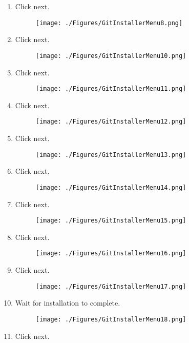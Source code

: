 \documentclass[12pt]{article}
\begin{document}
\begin{center}
\begin{enumerate}
		\item Click next.
		      \begin{figure}[H]
			      \texttt{[image: ./Figures/GitInstallerMenu8.png]}
		      \end{figure}
		\item Click next.
		      \begin{figure}[H]
			      \texttt{[image: ./Figures/GitInstallerMenu10.png]}
		      \end{figure}
		\item Click next.
		      \begin{figure}[H]
			      \texttt{[image: ./Figures/GitInstallerMenu11.png]}
		      \end{figure}
		\item Click next.
		      \begin{figure}[H]
			      \texttt{[image: ./Figures/GitInstallerMenu12.png]}
		      \end{figure}
		\item Click next.
		      \begin{figure}[H]
			      \texttt{[image: ./Figures/GitInstallerMenu13.png]}
		      \end{figure}
		\item Click next.
		      \begin{figure}[H]
			      \texttt{[image: ./Figures/GitInstallerMenu14.png]}
		      \end{figure}
		\item Click next.
		      \begin{figure}[H]
			      \texttt{[image: ./Figures/GitInstallerMenu15.png]}
		      \end{figure}
		\item Click next.
		      \begin{figure}[H]
			      \texttt{[image: ./Figures/GitInstallerMenu16.png]}
		      \end{figure}
		\item Click next.
		      \begin{figure}[H]
			      \texttt{[image: ./Figures/GitInstallerMenu17.png]}
		      \end{figure}
		\item Wait for installation to complete.
		      \begin{figure}[H]
			      \texttt{[image: ./Figures/GitInstallerMenu18.png]}
		      \end{figure}
		\item Click next.
	\end{enumerate}
\end{center}
\end{document}
